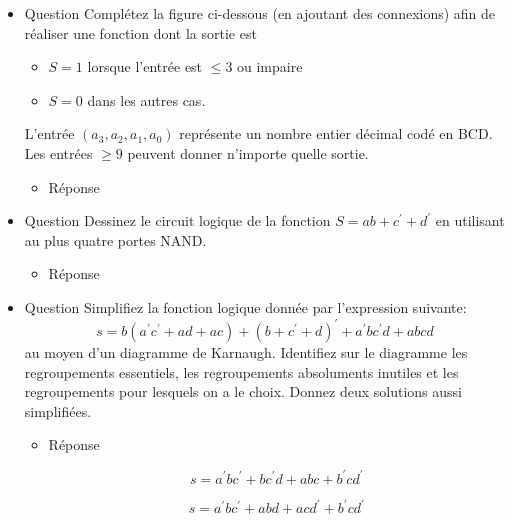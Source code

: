 \documentclass[letter, oneside]{book}
\begin{document}
\begin{itemize}
\item Question
\label{sec:orge56b4c7}
Complétez la figure ci-dessous (en ajoutant des connexions) afin de
réaliser une fonction dont la sortie est
\begin{itemize}
\item \(S=1\) lorsque l'entrée est \(\leq 3\) ou impaire
\item \(S=0\) dans les autres cas.
\end{itemize}
L'entrée \((a_3,a_2,a_1, a_0)\) représente un nombre entier décimal
codé en BCD. Les entrées \(\geq 9\) peuvent donner n'importe quelle
sortie. 

\begin{center}

\end{center}

\begin{itemize}
\item Réponse
\label{sec:org1d2d1b1}
\begin{center}

\end{center}
\end{itemize}

\item Question
\label{sec:org5b528c4}
Dessinez le circuit logique de la fonction \(S = a b + c^{\prime} +
d^{\prime}\) en utilisant au plus quatre portes NAND.

\begin{itemize}
\item Réponse
\label{sec:orgfa3aaf0}
\begin{center}

\end{center}
\end{itemize}

\item Question
\label{sec:org26f340f}
Simplifiez la fonction logique donnée par l'expression suivante:
    $$
    s = b (a^{\prime} c^{\prime} + a d + a c) + (b + c^{\prime}+
      d)^{\prime} + a^{\prime} b c^{\prime} d + a b c d
    $$
au moyen d'un diagramme de Karnaugh. Identifiez sur le diagramme les
regroupements essentiels, les regroupements absoluments inutiles et
les regroupements pour lesquels on a le choix. Donnez deux solutions
aussi simplifiées.

\begin{itemize}
\item Réponse
\label{sec:orgafce8b3}

\begin{center}

\end{center}
$$
  s = a^{\prime} b c^{\prime} + bc^{\prime}d + abc + b^{\prime}cd^{\prime}
$$
\begin{center}

\end{center}
$$
  s=  a^{\prime}bc^{\prime} + abd + acd^{\prime} + b^{\prime}cd^{\prime}
$$
\end{itemize}


\end{itemize}
\end{document}
